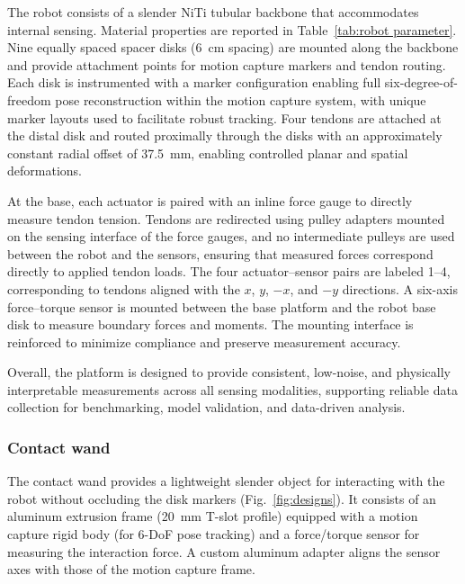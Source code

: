 \documentclass[14pt, a4paper]{article}
\begin{document}
The robot consists of a slender NiTi tubular backbone that accommodates internal sensing. Material properties are reported in Table~\ref{tab:robot parameter}. Nine equally spaced spacer disks (\SI{6}{\centi\meter} spacing) are mounted along the backbone and provide attachment points for motion capture markers and tendon routing. Each disk is instrumented with a marker configuration enabling full six-degree-of-freedom pose reconstruction within the motion capture system, with unique marker layouts used to facilitate robust tracking. Four tendons are attached at the distal disk and routed proximally through the disks with an approximately constant radial offset of \SI{37.5}{\milli\meter}, enabling controlled planar and spatial deformations.

At the base, each actuator is paired with an inline force gauge to directly measure tendon tension. Tendons are redirected using pulley adapters mounted on the sensing interface of the force gauges, and no intermediate pulleys are used between the robot and the sensors, ensuring that measured forces correspond directly to applied tendon loads. The four actuator–sensor pairs are labeled 1–4, corresponding to tendons aligned with the $x$, $y$, $-x$, and $-y$ directions. A six-axis force–torque sensor is mounted between the base platform and the robot base disk to measure boundary forces and moments. The mounting interface is reinforced to minimize compliance and preserve measurement accuracy.

Overall, the platform is designed to provide consistent, low-noise, and physically interpretable measurements across all sensing modalities, supporting reliable data collection for benchmarking, model validation, and data-driven analysis.


\subsubsection{Contact wand}


The contact wand provides a lightweight slender object for interacting with the robot without occluding the disk markers (Fig.~\ref{fig:designs}).
It consists of an aluminum extrusion frame (\SI{20}{\milli\meter} T-slot profile) equipped with a motion capture rigid body (for 6-DoF pose tracking) and a force/torque sensor for measuring the interaction force.
A custom aluminum adapter aligns the sensor axes with those of the motion capture frame.
\end{document}
